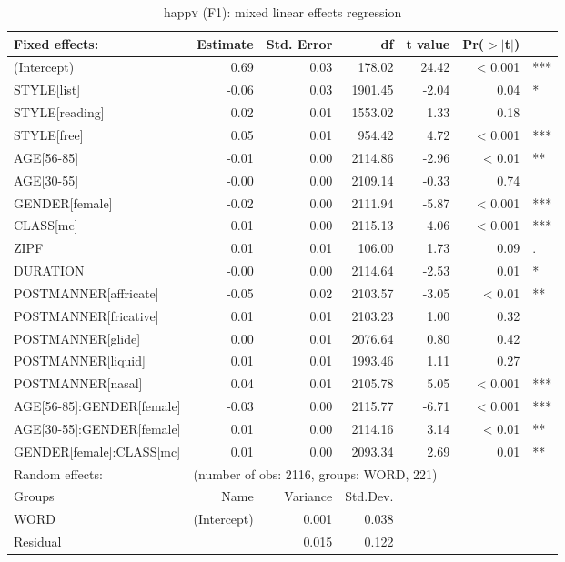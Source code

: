 	\begin{table}[h]
		\centering
		\caption{happ\textsc{y} (F1): mixed linear effects regression}
		\label{tab.regression.happy.f1}
		\footnotesize
		\begin{tabular}{p{}rrrrrl}
			\hline
			Fixed effects: & Estimate & Std. Error & df & t value & Pr($>$$|$t$|$) & \\ 
			\hline
			(Intercept) & 0.69 & 0.03 & 178.02 & 24.42 & < 0.001 & *** \\ 
			STYLE[list] & -0.06 & 0.03 & 1901.45 & -2.04 & 0.04 & * \\ 
			STYLE[reading] & 0.02 & 0.01 & 1553.02 & 1.33 & 0.18 & \\ 
			STYLE[free] & 0.05 & 0.01 & 954.42 & 4.72 & < 0.001 & *** \\ 
			AGE[56-85] & -0.01 & 0.00 & 2114.86 & -2.96 & < 0.01 & **\\ 
			AGE[30-55] & -0.00 & 0.00 & 2109.14 & -0.33 & 0.74 & \\ 
			GENDER[female] & -0.02 & 0.00 & 2111.94 & -5.87 & < 0.001 & *** \\ 
			CLASS[mc] & 0.01 & 0.00 & 2115.13 & 4.06 & < 0.001 & *** \\ 
			ZIPF & 0.01 & 0.01 & 106.00 & 1.73 & 0.09 & .\\ 
			DURATION & -0.00 & 0.00 & 2114.64 & -2.53 & 0.01 & *\\ 
			POSTMANNER[affricate] & -0.05 & 0.02 & 2103.57 & -3.05 & < 0.01 & ** \\ 
			POSTMANNER[fricative] & 0.01 & 0.01 & 2103.23 & 1.00 & 0.32 & \\ 
			POSTMANNER[glide] & 0.00 & 0.01 & 2076.64 & 0.80 & 0.42 & \\ 
			POSTMANNER[liquid] & 0.01 & 0.01 & 1993.46 & 1.11 & 0.27 & \\ 
			POSTMANNER[nasal] & 0.04 & 0.01 & 2105.78 & 5.05 & < 0.001 & *** \\ 
			AGE[56-85]:GENDER[female] & -0.03 & 0.00 & 2115.77 & -6.71 & < 0.001 & *** \\ 
			AGE[30-55]:GENDER[female] & 0.01 & 0.00 & 2114.16 & 3.14 & < 0.01 & ** \\ 
			GENDER[female]:CLASS[mc] & 0.01 & 0.00 & 2093.34 & 2.69 & 0.01 & **\\ 
			\hline
			Random effects: & \multicolumn{6}{l}{(number of obs: 2116, groups: WORD, 221)} \\
			Groups &         Name & Variance &      Std.Dev. & & & \\
			WORD &  (Intercept) & 0.001 & 0.038 & & & \\
			Residual  &         & 0.015 & 0.122 & & & \\
			\hline
		\end{tabular}
	\end{table}

